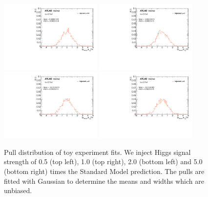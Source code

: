 \begin{figure}[htbp]
  \centering
 \includegraphics[width=0.45\textwidth]{figures/VBF/Mu05.pdf}
 \includegraphics[width=0.45\textwidth]{figures/VBF/Mu1.pdf}\\
 \includegraphics[width=0.45\textwidth]{figures/VBF/Mu2.pdf}
 \includegraphics[width=0.45\textwidth]{figures/VBF/Mu5.pdf}\\
\caption{Pull distribution of toy experiment fits. We inject Higgs signal strength of 0.5 (top left), 1.0 (top right), 2.0 (bottom left) and 5.0 (bottom right) times the Standard Model prediction. The pulls are fitted with Gaussian to determine the means and widths which are unbiased. }
  \label{fig:MCToy}
\end{figure}



